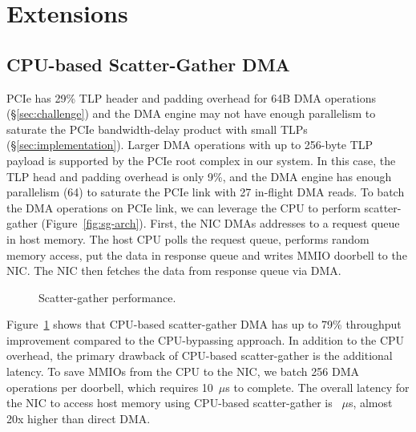 \section{Extensions}
\label{sec:extensions}

\subsection{CPU-based Scatter-Gather DMA}

PCIe has 29\% TLP header and padding overhead for 64B DMA operations (\S\ref{sec:challenge}) and the DMA engine may not have enough parallelism to saturate the PCIe bandwidth-delay product with small TLPs (\S\ref{sec:implementation}).
Larger DMA operations with up to 256-byte TLP payload is supported by the PCIe root complex in our system. In this case, the TLP head and padding overhead is only 9\%, and the DMA engine has enough parallelism (64) to saturate the PCIe link with 27 in-flight DMA reads.
To batch the DMA operations on PCIe link, we can leverage the CPU to perform scatter-gather (Figure~\ref{fig:sg-arch}).
First, the NIC DMAs addresses to a request queue in host memory. The host CPU polls the request queue, performs random memory access, put the data in response queue and writes MMIO doorbell to the NIC. The NIC then fetches the data from response queue via DMA.

\begin{figure}[t]
\centering
{}
\caption{Scatter-gather performance.}
\label{fig:scatter-gather}
\vspace{-15pt}
\end{figure}

Figure~\ref{fig:scatter-gather} shows that CPU-based scatter-gather DMA has up to 79\% throughput improvement compared to the CPU-bypassing approach.
In addition to the CPU overhead, the primary drawback of CPU-based scatter-gather is the additional latency.
To save MMIOs from the CPU to the NIC, we batch 256 DMA operations per doorbell, which requires 10~$\mu$s to complete.
The overall latency for the NIC to access host memory using CPU-based scatter-gather is ~$\mu$s, almost 20x higher than direct DMA.

